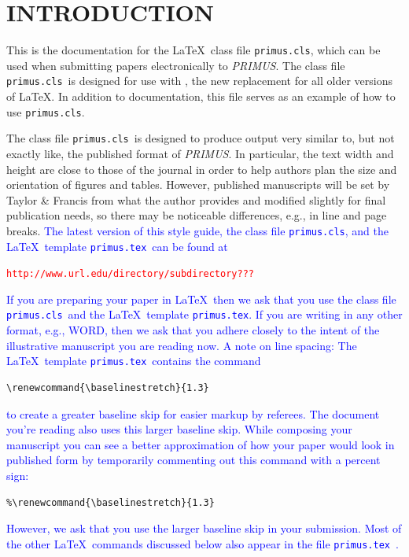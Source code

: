 \documentclass{primus}
\renewcommand{\baselinestretch}{1.3}
\newcommand{\pcls}{{\tt primus.cls}}
\newcommand{\ptemp}{{\tt primus.tex}}
\newcommand{\PR}{{\it PRIMUS}}
\begin{document}
\section{INTRODUCTION}

This is the  documentation for the \LaTeX\ class file \pcls, which can be used
when submitting papers electronically to \PR. The class file \pcls\ is designed for use
with \LaTeXe, the new replacement for all older versions of \LaTeX. In addition to documentation, this file serves as an example of how to use \pcls. 

The class file \pcls\ is designed to produce output very similar to, but not exactly like, the published format of \PR. In particular, the text width and height are close to those of the journal in order to help authors plan the size and orientation of figures and tables. However, published manuscripts will be set by Taylor \& Francis from what the author provides and modified slightly for  final publication needs, so there may be noticeable differences,  e.g., in line and page breaks. \textcolor{blue}{The latest version of this style guide, the class file \pcls, and the  \LaTeX\ template \ptemp\ can be found at}
\begin{center}
\textcolor{red}{\tt http://www.url.edu/directory/subdirectory???}
\end{center}

\textcolor{blue}{
If you are preparing your paper in \LaTeX\ then we ask that you use the class file \pcls\ and the  \LaTeX\ template \ptemp. If you are writing  in any other format, e.g., WORD, then we ask that you adhere closely to the intent of the illustrative manuscript you are reading now.
}
\textcolor{blue}{
A note on line spacing: The \LaTeX\ template \ptemp\  contains the command}
\begin{verbatim}
\renewcommand{\baselinestretch}{1.3}
\end{verbatim}
\textcolor{blue}{
to create a greater baseline skip for easier markup by referees. The document you're reading also uses this larger baseline skip. While composing your manuscript you can see a better approximation of how your paper would look in published form by temporarily commenting out this command with a percent sign: 
}
\begin{verbatim}
%\renewcommand{\baselinestretch}{1.3}
\end{verbatim}
\textcolor{blue}{
However, we ask that you use the larger baseline skip in your submission. Most of the other \LaTeX\ commands discussed below also appear in the file \ptemp\ .
}
\end{document}
